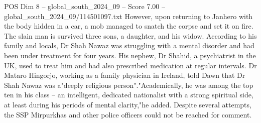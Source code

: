 \begin{textsample}{POS Dim 8 – global\_south\_2024\_09 – Score 7.00 – global\_south\_2024\_09/114501097.txt}
However, upon returning to Janhero with the body hidden in a car, a mob managed to snatch the corpse and set it on fire.
The slain man is survived three sons, a daughter, and his widow.
According to his family and locals, Dr Shah Nawaz was struggling with a mental disorder and had been under treatment for four years.
His nephew, Dr Shahid, a psychiatrist in the UK, used to treat him and had also prescribed medication at regular intervals.
Dr Mataro Hingorjo, working as a family physician in Ireland, told Dawn that Dr Shah Nawaz was a"deeply religious person"."Academically, he was among the top ten in his class -- an intelligent, dedicated nationalist with a strong spiritual side, at least during his periods of mental clarity,"he added.
Despite several attempts, the SSP Mirpurkhas and other police officers could not be reached for comment.

\end{textsample}
